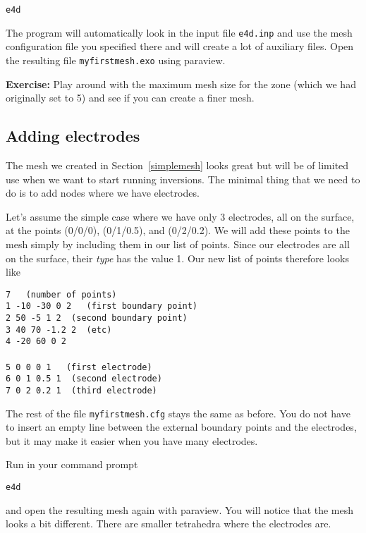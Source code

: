 \documentclass[11pt]{article}
\begin{document}
\qquad \verb+e4d+

The program will automatically look in the input file \verb#e4d.inp#
and use the mesh configuration file you specified there and will
create a lot of auxiliary files. Open the resulting file
\verb#myfirstmesh.exo# using paraview.


\textbf{Exercise:}
Play around with the maximum mesh size for the zone (which we had originally set to 5) and see if you can create a finer mesh.


\subsection{Adding electrodes}

The mesh we created in Section~\ref{simplemesh} looks great but will
be of limited use when we want to start running inversions. The
minimal thing that we need to do is to add nodes where we have
electrodes.

Let's assume the simple case where we have only 3 electrodes, all on
the surface, at the points (0/0/0), (0/1/0.5), and (0/2/0.2). We will
add these points to the mesh simply by including them in our list of
points. Since our electrodes are all on the surface, their \emph{type}
has the value 1. Our new list of points therefore looks like

\verb+7   (number of points)+\\
\verb+1 -10 -30 0 2   (first boundary point)+\\
\verb+2 50 -5 1 2  (second boundary point)+\\
\verb+3 40 70 -1.2 2  (etc)+\\
\verb+4 -20 60 0 2+\\
\verb++\\
\verb+5 0 0 0 1   (first electrode)+\\
\verb+6 0 1 0.5 1  (second electrode)+\\
\verb+7 0 2 0.2 1  (third electrode)+

The rest of the file \verb+myfirstmesh.cfg+ stays the same as
before. You do not have to insert an empty line between the external
boundary points and the electrodes, but it may make it easier when you
have many electrodes. 

Run in your command prompt

\qquad \verb+e4d+

and open the resulting mesh again with paraview. You will notice that
the mesh looks a bit different. There are smaller tetrahedra where the
electrodes are.
\end{document}
